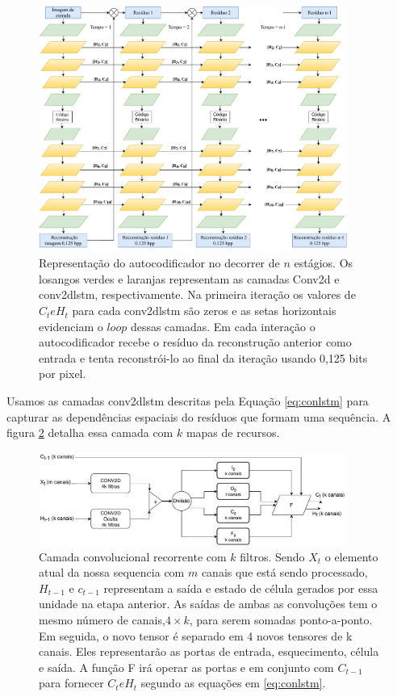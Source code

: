 \begin{figure}[htbp]
	\centering
	\includegraphics[width=0.90\textwidth]{figuras/redeTCC.pdf}
	\caption[Autocodificador desenrolado no tempo]{Representação do autocodificador no decorrer de $n$ estágios. Os losangos verdes e laranjas representam as camadas Conv2d e \acrshort{conv2dlstm}, respectivamente.  Na primeira iteração os valores de $C_t e H_t$ para cada \acrshort{conv2dlstm} são zeros e as setas horizontais evidenciam o $loop$ dessas camadas. Em cada interação o autocodificador recebe o resíduo da reconstrução anterior como entrada e tenta reconstrói-lo ao final da iteração usando 0,125 bits por pixel.}
	\label{fig:rede_toderici}
\end{figure}

Usamos as camadas \acrshort{conv2dlstm} descritas pela Equação \ref{eq:conlstm} para capturar as dependências espaciais do resíduos que formam uma sequência. A figura \ref{fig:convlstm} detalha essa camada com $k$ mapas de recursos. 

\begin{figure}[ht]
	\centering
	\includegraphics[width=0.90\textwidth]{figuras/convlstm.pdf}
	\caption[Conv2DLSTM]{Camada convolucional recorrente com $k$ filtros. Sendo $X_t$ o elemento atual da nossa sequencia com $m$ canais que está sendo processado, $H_{t-1}$ e $c_{t-1}$ representam a saída e estado de célula gerados por essa unidade na etapa anterior. As saídas de ambas as convoluções tem o mesmo número de canais,$4\times k$, para serem somadas ponto-a-ponto. Em seguida, o novo tensor é separado em 4 novos tensores de k canais. Eles representarão as portas de entrada, esquecimento, célula e saída. A função F irá operar as portas e em conjunto com $C_{t-1}$ para fornecer $C_t e H_t$ segundo as equações em \ref{eq:conlstm}.}
	\label{fig:convlstm}
\end{figure}

